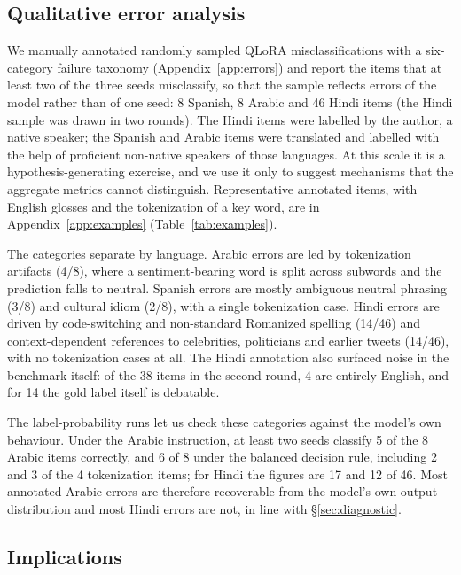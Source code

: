 \documentclass[11pt]{article}
\begin{document}
\subsection{Qualitative error analysis}
\label{sec:qualitative}

We manually annotated randomly sampled QLoRA misclassifications with a
six-category failure taxonomy (Appendix~\ref{app:errors}) and report the items that
at least two of the three seeds misclassify, so that the sample reflects errors of
the model rather than of one seed: 8 Spanish, 8 Arabic and 46 Hindi items (the Hindi
sample was drawn in two rounds). The Hindi items were labelled by the author, a native speaker; the Spanish and Arabic items
were translated and labelled with the help of proficient non-native speakers of
those languages. At this scale it is a hypothesis-generating exercise, and we use it
only to suggest mechanisms that the aggregate metrics cannot distinguish. Representative annotated items, with English glosses and the
tokenization of a key word, are in Appendix~\ref{app:examples}
(Table~\ref{tab:examples}).

The categories separate by language. Arabic errors are led by tokenization
artifacts (4/8), where a sentiment-bearing word is split across subwords and the
prediction falls to neutral. Spanish errors are mostly ambiguous neutral phrasing
(3/8) and cultural idiom (2/8), with a single tokenization case. Hindi errors are
driven by code-switching and non-standard Romanized spelling (14/46) and
context-dependent references to celebrities, politicians and earlier tweets
(14/46), with no tokenization cases at all. The Hindi annotation also surfaced
noise in the benchmark itself: of the 38 items in the second round, 4 are entirely
English, and for 14 the gold label itself is debatable.

The label-probability runs let us check these categories against the model's own
behaviour. Under the Arabic instruction, at least two seeds classify 5 of the 8
Arabic items correctly, and 6 of 8 under the balanced decision rule, including 2 and
3 of the 4 tokenization items; for Hindi the figures are 17 and 12 of 46. Most
annotated Arabic errors are therefore recoverable from the model's own output
distribution and most Hindi errors are not, in line with \S\ref{sec:diagnostic}.

\subsection{Implications}
\label{sec:implications}
\end{document}
